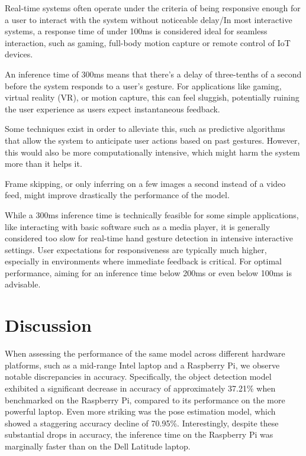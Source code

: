 \documentclass[12pt]{article}
\begin{document}
Real-time systems often operate under the criteria of being responsive enough for a user to interact with the system without noticeable delay/In most interactive systems, a response time of under 100ms is considered ideal for seamless interaction, such as gaming, full-body motion capture or remote control of IoT devices.

An inference time of 300ms means that there's a delay of three-tenths of a second before the system responds to a user's gesture. For applications like gaming, virtual reality (VR), or motion capture, this can feel sluggish, potentially ruining the user experience as users expect instantaneous feedback.

Some techniques exist in order to alleviate this, such as predictive algorithms that allow the system to anticipate user actions based on past gestures. However, this would also be more computationally intensive, which might harm the system more than it helps it.

Frame skipping, or only inferring on a few images a second instead of a video feed, might improve drastically the performance of the model. 

While a 300ms inference time is technically feasible for some simple applications, like interacting with basic software such as a media player, it is generally considered too slow for real-time hand gesture detection in intensive interactive settings. User expectations for responsiveness are typically much higher, especially in environments where immediate feedback is critical. For optimal performance, aiming for an inference time below 200ms or even below 100ms is advisable. 

\section{Discussion}

When assessing the performance of the same model across different hardware platforms, such as a mid-range Intel laptop and a Raspberry Pi, we observe notable discrepancies in accuracy. Specifically, the object detection model exhibited a significant decrease in accuracy of approximately 37.21\% when benchmarked on the Raspberry Pi, compared to its performance on the more powerful laptop. Even more striking was the pose estimation model, which showed a staggering accuracy decline of 70.95\%. Interestingly, despite these substantial drops in accuracy, the inference time on the Raspberry Pi was marginally faster than on the Dell Latitude laptop.
\end{document}
